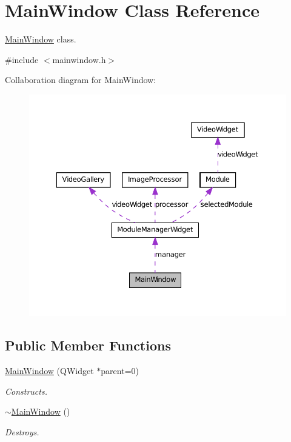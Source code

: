 \hypertarget{class_main_window}{
\section{MainWindow Class Reference}
\label{d9/dc6/class_main_window}
}


\hyperlink{class_main_window}{MainWindow} class.  




{\ttfamily \#include $<$mainwindow.h$>$}



Collaboration diagram for MainWindow:
\nopagebreak
\begin{figure}[H]
\begin{center}
\leavevmode
\includegraphics[width=369pt]{d0/db8/class_main_window__coll__graph}
\end{center}
\end{figure}
\subsection*{Public Member Functions}
\begin{DoxyCompactItemize}
\item 
\hyperlink{class_main_window_a8b244be8b7b7db1b08de2a2acb9409db}{MainWindow} (QWidget $\ast$parent=0)
\begin{DoxyCompactList}\small\item\em Constructs. \item\end{DoxyCompactList}\item 
\hypertarget{class_main_window_ae98d00a93bc118200eeef9f9bba1dba7}{
\hyperlink{class_main_window_ae98d00a93bc118200eeef9f9bba1dba7}{$\sim$MainWindow} ()}
\label{d9/dc6/class_main_window_ae98d00a93bc118200eeef9f9bba1dba7}

\begin{DoxyCompactList}\small\item\em Destroys. \item\end{DoxyCompactList}\end{DoxyCompactItemize}


